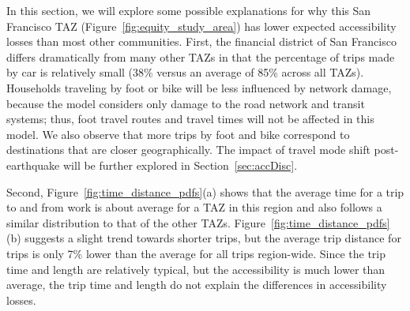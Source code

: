In this section, we will explore some possible explanations for why this San Francisco TAZ (Figure~\ref{fig:equity_study_area}) has lower expected accessibility losses than most other communities.
First, the financial district of San Francisco differs dramatically from many other TAZs in that the percentage of trips made by car is relatively small (38\% versus an average of 85\% across all TAZs). Households traveling by foot or bike will be less influenced by network damage, because the model considers only damage to the road network and transit systems; thus, foot travel routes and travel times will not be affected in this model. We also observe that more trips by foot and bike correspond to destinations that are closer geographically. The impact of travel mode shift post-earthquake will be further explored in Section~\ref{sec:accDisc}.
 
 Second,  Figure~\ref{fig:time_distance_pdfs}{(a)} shows that the average time for a trip to and from work is about average for a TAZ in this region and also follows a similar distribution to that of the other TAZs. Figure~\ref{fig:time_distance_pdfs}{(b)} suggests a slight trend towards shorter trips, but the average trip distance for trips is only 7\% lower than the average for all trips region-wide. Since the trip time and length are relatively typical, but the accessibility is much lower than average, the trip time and length do not explain the differences in accessibility losses.
 

